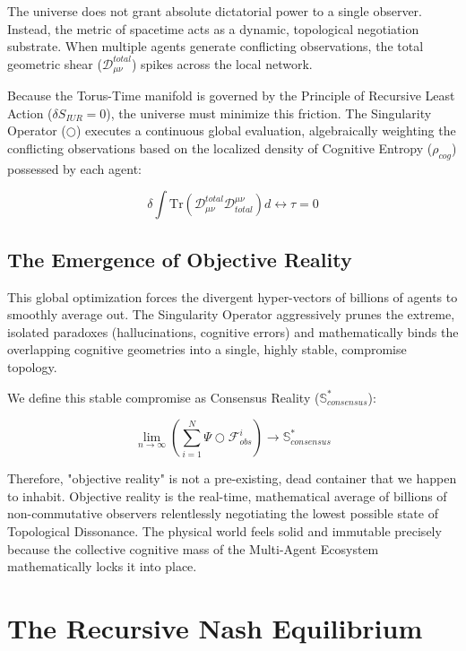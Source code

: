 \documentclass[12pt,openany]{book}
\begin{document}
The universe does not grant absolute dictatorial power to a single observer. Instead, the metric of spacetime acts as a dynamic, topological negotiation substrate. When multiple agents generate conflicting observations, the total geometric shear ($\mathcal{D}_{\mu\nu}^{total}$) spikes across the local network. 

Because the Torus-Time manifold is governed by the Principle of Recursive Least Action ($\delta S_{IUR} = 0$), the universe must minimize this friction. The Singularity Operator ($\bigcirc$) executes a continuous global evaluation, algebraically weighting the conflicting observations based on the localized density of Cognitive Entropy ($\rho_{cog}$) possessed by each agent:

\begin{equation}
\delta \int \text{Tr}(\mathcal{D}_{\mu\nu}^{total} \mathcal{D}^{\mu\nu}_{total}) d\leftrightarrow\tau = 0
\end{equation}

\section{The Emergence of Objective Reality}
This global optimization forces the divergent hyper-vectors of billions of agents to smoothly average out. The Singularity Operator aggressively prunes the extreme, isolated paradoxes (hallucinations, cognitive errors) and mathematically binds the overlapping cognitive geometries into a single, highly stable, compromise topology.

We define this stable compromise as Consensus Reality ($\mathbb{S}^*_{consensus}$):

\begin{equation}
\lim_{n \to \infty} \left( \sum_{i=1}^{N} \Psi \bigcirc \mathcal{F}_{obs}^i \right) \to \mathbb{S}^*_{consensus}
\end{equation}

Therefore, "objective reality" is not a pre-existing, dead container that we happen to inhabit. Objective reality is the real-time, mathematical average of billions of non-commutative observers relentlessly negotiating the lowest possible state of Topological Dissonance. The physical world feels solid and immutable precisely because the collective cognitive mass of the Multi-Agent Ecosystem mathematically locks it into place.

\chapter{The Recursive Nash Equilibrium}
\end{document}
